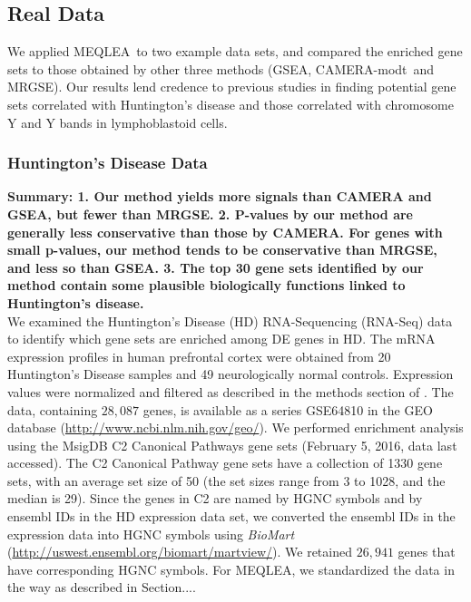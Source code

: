 \documentclass[a4,center,fleqn]{NAR}
\newcommand{\OurMethod}{MEQLEA}
\newcommand{\CMT}{CAMERA-modt}
\newcommand{\genr}{MRGSE}
\begin{document}
	\subsection{Real Data}\label{section:realdata}
	We applied \OurMethod~to two example data sets, and compared the enriched gene sets to those
	obtained by other three methods (GSEA, \CMT~and \genr). %
	Our results lend credence to previous studies in finding potential gene sets correlated with
	Huntington's disease and those correlated with chromosome Y and Y bands in lymphoblastoid cells.  
	
	\subsubsection{Huntington's Disease Data}
	\textbf{Summary: 1. Our method yields more signals than CAMERA and GSEA, but fewer than MRGSE. 2. P-values by our method are generally less conservative than those by CAMERA. For genes with small p-values, our method tends to be conservative than MRGSE, and less so than GSEA. 3. The top 30 gene sets identified by our method contain some plausible biologically functions linked to Huntington's disease.}\\
	
	We examined the Huntington's Disease (HD) RNA-Sequencing (RNA-Seq) data \citep{labadorf2015rna}  to
	identify which gene sets are enriched among DE genes in HD. The mRNA expression profiles in human
	prefrontal cortex were obtained from 20 Huntington's Disease samples and 49 neurologically normal
	controls.  Expression values were normalized and filtered as described in the methods section of
	\cite{labadorf2015rna}.
	The data, containing $28,087$ genes, is available as a series GSE64810 in the GEO database
	(\url{http://www.ncbi.nlm.nih.gov/geo/}). We performed enrichment analysis using the MsigDB
	\citep{subramanian2005gene} C2 Canonical Pathways gene sets (February 5, 2016, data last accessed).
	The C2 Canonical Pathway gene sets have a collection of 1330 gene sets, with an average set size of
	50 (the set sizes range from 3 to 1028, and the median is 29). Since the genes in C2 are named by
	HGNC symbols and by ensembl IDs in the HD expression data set, we converted the ensembl IDs in the
	expression data into HGNC symbols using \textit{BioMart}
	(\url{http://uswest.ensembl.org/biomart/martview/}). We retained $26,941$ genes that have
	corresponding HGNC symbols. For \OurMethod, we standardized the data in the way as described in
	Section....
	
\end{document}
